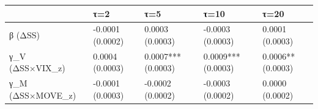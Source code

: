 \begin{tabular}{lllll}
\toprule
 & τ=2 & τ=5 & τ=10 & τ=20 \\
\midrule
β (ΔSS) & -0.0001
(0.0002) & 0.0003
(0.0003) & -0.0003
(0.0003) & 0.0001
(0.0003) \\
γ_V (ΔSS×VIX_z) & 0.0004
(0.0003) & 0.0007***
(0.0003) & 0.0009***
(0.0003) & 0.0006**
(0.0003) \\
γ_M (ΔSS×MOVE_z) & -0.0001
(0.0003) & -0.0002
(0.0002) & -0.0003
(0.0002) & 0.0000
(0.0002) \\
\bottomrule
\end{tabular}
